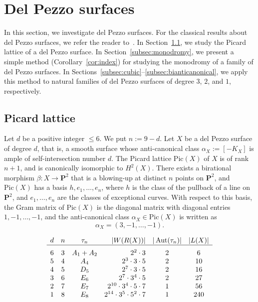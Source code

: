 \documentclass{math}
\theoremstyle{plain}
\numberwithin{equation}{section}
\DeclareMathOperator{\Aut}{Aut}
\newcommand{\mystruth}[1]{\phantom{\hbox{\vrule height #1}}}
\newcommand{\Pic}{\mathrm{Pic}}
\newcommand{\bfP}{\mathbf{P}}
\begin{document}
\section{Del Pezzo surfaces}\label{sec:monodromy}
%
In this section, we investigate del Pezzo surfaces.
For the classical results about del Pezzo surfaces, 
we refer the reader to~\cite{Demazure1980, Manin1986}. %
In Section~\ref{subsec:Pic}, 
we study the Picard lattice of a  del Pezzo surface.
In Section~\ref{subsec:monodromy},
we present a simple method (Corollary~\ref{cor:index})
for studying   the monodromy  
of a family of del Pezzo surfaces.
In Sections~\ref{subsec:cubic}--\ref{subsec:bianticanonical},
we apply this method 
to natural families of del Pezzo surfaces of degree $3$, $2$, and $1$, respectively. 
%
\subsection{Picard lattice}\label{subsec:Pic}
%
Let $d$ be a positive integer $\le 6$. 
We put 
$n:=9-d$.
Let $X$ be a del Pezzo surface of degree $d$,
that is, a smooth surface 
whose anti-canonical class 
$\alpha_{X}:=[-K_X]$ 
is ample of self-intersection number $d$.
The Picard lattice $\Pic(X)$ of $X$ is of rank $n+1$,
and is canonically isomorphic to $H^2(X)$.  
There exists a birational morphism 
%
$\beta\colon X\to {\bfP}^{2}$
%
that is a blowing-up at  distinct $n$ points on ${\bfP}^{2}$,
and $\Pic(X)$ has a basis $h, e_1, \dots, e_n$,
where $h$ is the class of the pullback of a line  on ${\bfP}^{2}$, and $e_1, \dots, e_n$
are the classes of exceptional curves.
With respect to this basis, 
the Gram matrix of $\Pic(X)$  is the diagonal matrix
with diagonal entries $1, -1, \dots, -1$, 
and the anti-canonical   class $\alpha_{X}\in \Pic(X)$
is written as 
%
\begin{equation*}\label{eq:aX}
\alpha_{X}=(3, -1, \dots, -1).
\end{equation*}
%
\begin{table}
\[
%
\begin{array}{cccrcc}
d & n & \tau_n & |W(R(X))| &  |\Aut(\tau_n)| & |L(X)|  \\ 
\hline
6 & 3 & A_{1}+A_{2} & {2}^{2} \cdot {3} & 2 & 6 \mystruth{14pt} \\ 
5 & 4 & A_{4} & {2}^{3} \cdot {3} \cdot {5} & 2 & 10  \\ 
4 & 5 & D_{5} & {2}^{7} \cdot {3} \cdot {5} & 2 & 16  \\ 
3 & 6 & E_{6} & {2}^{7} \cdot {3}^{4} \cdot {5} & 2 & 27  \\ 
2 & 7 & E_{7} & {2}^{10} \cdot {3}^{4} \cdot {5} \cdot {7} & 1 & 56  \\ 
1 & 8 & E_{8} & {2}^{14} \cdot {3}^{5} \cdot {5}^{2} \cdot {7} & 1 & 240  \\ 
\end{array}
%
%
\]
\caption{Lattice theoretic data}\label{table:Table1}
\end{table}%
\end{document}
